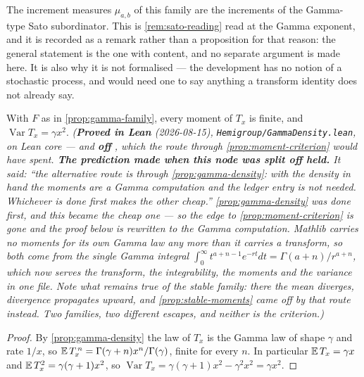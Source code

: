 \begin{remark}\label{rem:gamma-sato}
The increment measures $\mu_{a,b}$ of this family are the increments of the Gamma-type Sato
subordinator. This is \ref{rem:sato-reading} read at the Gamma exponent, and it is recorded as a
remark rather than a proposition for that reason: the general statement is the one with content,
and no separate argument is made here. It is also why it is not formalised --- the development has
no notion of a stochastic process, and would need one to say anything a transform identity does
not already say.
\end{remark}

\begin{proposition}\label{prop:gamma-moments}
\leanok
With $F$ as in \ref{prop:gamma-family}, every moment of $T_x$ is finite, and
$\operatorname{Var} T_x = \gamma x^2$.
\statusT\quad\emph{(\textbf{Proved in Lean} (2026-08-15),
\texttt{Hemigroup/GammaDensity.lean}, on Lean core --- and \textbf{off }, which
the route through \ref{prop:moment-criterion} would have spent.
\textbf{The prediction made when this node was split off held.} It said: ``the alternative route
is through \ref{prop:gamma-density}: with the density in hand the moments are a Gamma computation
and the ledger entry is not needed. Whichever is done first makes the other cheap.''
\ref{prop:gamma-density} was done first, and this became the cheap one --- so the \uses edge to
\ref{prop:moment-criterion} is gone and the proof below is rewritten to the Gamma computation.
Mathlib carries no moments for its own Gamma law any more than it carries a transform, so both
come from the single Gamma integral $\int_0^\infty t^{a+n-1}e^{-rt}dt = \Gamma(a+n)/r^{a+n}$,
which now serves the transform, the integrability, the moments and the variance in one file.
Note what remains true of the \emph{stable} family: there the mean diverges, divergence propagates
upward, and \ref{prop:stable-moments} came off  by that route instead. Two families,
two different escapes, and neither is the criterion.)}
\end{proposition}

\begin{proof}
\leanok
By \ref{prop:gamma-density} the law of $T_x$ is the Gamma law of shape $\gamma$ and rate $1/x$, so
$\mathbb{E}\,T_x^{\,n} = \Gamma(\gamma+n)x^{n}/\Gamma(\gamma)$, finite for every $n$. In particular
$\mathbb{E}\,T_x = \gamma x$ and $\mathbb{E}\,T_x^{2} = \gamma(\gamma+1)x^{2}$, so
$\operatorname{Var} T_x = \gamma(\gamma+1)x^2 - \gamma^2x^2 = \gamma x^2$.
\end{proof}

